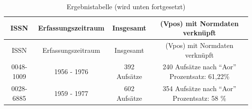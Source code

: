 \documentclass[a4paper,
fontsize=11pt,
oneside,
numbers=noperiodatend,
parskip=half-,
bibliography=totoc,
final
]{scrartcl}
\begin{document}
\begin{longtable}[c]{@{}cccc@{}}
\caption{Ergebnistabelle (wird unten fortgesetzt)}\tabularnewline
\toprule
\begin{minipage}[b]{0.11\columnwidth}\centering\strut
ISSN
\strut\end{minipage} &
\begin{minipage}[b]{0.24\columnwidth}\centering\strut
Erfassungszeitraum
\strut\end{minipage} &
\begin{minipage}[b]{0.15\columnwidth}\centering\strut
Insgesamt
\strut\end{minipage} &
\begin{minipage}[b]{0.38\columnwidth}\centering\strut
(Vpos) mit Normdaten verknüpft
\strut\end{minipage}\tabularnewline
\midrule
\endfirsthead
\toprule
\begin{minipage}[b]{0.11\columnwidth}\centering\strut
ISSN
\strut\end{minipage} &
\begin{minipage}[b]{0.24\columnwidth}\centering\strut
Erfassungszeitraum
\strut\end{minipage} &
\begin{minipage}[b]{0.15\columnwidth}\centering\strut
Insgesamt
\strut\end{minipage} &
\begin{minipage}[b]{0.38\columnwidth}\centering\strut
(Vpos) mit Normdaten verknüpft
\strut\end{minipage}\tabularnewline
\midrule
\endhead
\begin{minipage}[t]{0.11\columnwidth}\centering\strut
0048-1009
\strut\end{minipage} &
\begin{minipage}[t]{0.24\columnwidth}\centering\strut
1956 - 1976
\strut\end{minipage} &
\begin{minipage}[t]{0.15\columnwidth}\centering\strut
392 Aufsätze
\strut\end{minipage} &
\begin{minipage}[t]{0.38\columnwidth}\centering\strut
240 Aufsätze nach \enquote{Aor} Prozentsatz: 61,22\%
\strut\end{minipage}\tabularnewline
\begin{minipage}[t]{0.11\columnwidth}\centering\strut
0028-6885
\strut\end{minipage} &
\begin{minipage}[t]{0.24\columnwidth}\centering\strut
1959 - 1977
\strut\end{minipage} &
\begin{minipage}[t]{0.15\columnwidth}\centering\strut
602 Aufsätze
\strut\end{minipage} &
\begin{minipage}[t]{0.38\columnwidth}\centering\strut
354 Aufsätze nach \enquote{Aor} Prozentsatz: 58 \%
\strut\end{minipage}\tabularnewline
\bottomrule
\end{longtable}
\end{document}
